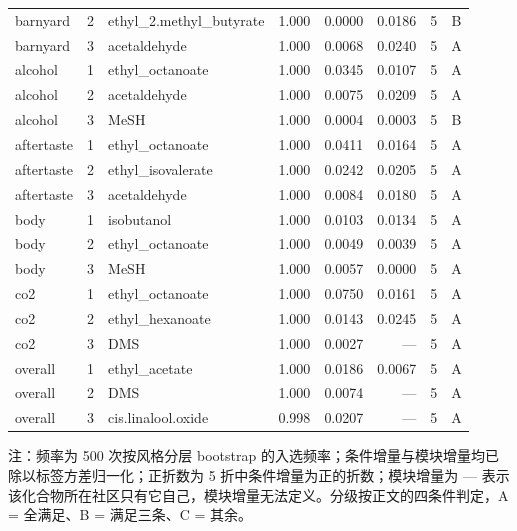 \begin{longtable}{@{}p{} r p{} r r r r c@{}}
barnyard & 2 & ethyl\_2.\allowbreak{}methyl\_butyrate & 1.000 & 0.0000 & 0.0186 & 5 & B \\
barnyard & 3 & acetaldehyde & 1.000 & 0.0068 & 0.0240 & 5 & A \\
alcohol & 1 & ethyl\_octanoate & 1.000 & 0.0345 & 0.0107 & 5 & A \\
alcohol & 2 & acetaldehyde & 1.000 & 0.0075 & 0.0209 & 5 & A \\
alcohol & 3 & MeSH & 1.000 & 0.0004 & 0.0003 & 5 & B \\
aftertaste & 1 & ethyl\_octanoate & 1.000 & 0.0411 & 0.0164 & 5 & A \\
aftertaste & 2 & ethyl\_isovalerate & 1.000 & 0.0242 & 0.0205 & 5 & A \\
aftertaste & 3 & acetaldehyde & 1.000 & 0.0084 & 0.0180 & 5 & A \\
body & 1 & isobutanol & 1.000 & 0.0103 & 0.0134 & 5 & A \\
body & 2 & ethyl\_octanoate & 1.000 & 0.0049 & 0.0039 & 5 & A \\
body & 3 & MeSH & 1.000 & 0.0057 & 0.0000 & 5 & A \\
co2 & 1 & ethyl\_octanoate & 1.000 & 0.0750 & 0.0161 & 5 & A \\
co2 & 2 & ethyl\_hexanoate & 1.000 & 0.0143 & 0.0245 & 5 & A \\
co2 & 3 & DMS & 1.000 & 0.0027 & --- & 5 & A \\
overall & 1 & ethyl\_acetate & 1.000 & 0.0186 & 0.0067 & 5 & A \\
overall & 2 & DMS & 1.000 & 0.0074 & --- & 5 & A \\
overall & 3 & cis.\allowbreak{}linalool.\allowbreak{}oxide & 0.998 & 0.0207 & --- & 5 & A \\
\end{longtable}

\noindent\footnotesize 注：频率为 500 次按风格分层 bootstrap 的入选频率；条件增量与模块增量均已除以标签方差归一化；正折数为 5 折中条件增量为正的折数；模块增量为 --- 表示该化合物所在社区只有它自己，模块增量无法定义。分级按正文的四条件判定，A = 全满足、B = 满足三条、C = 其余。
